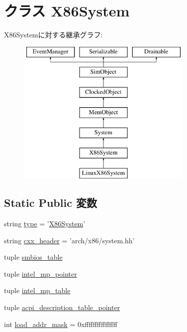 \hypertarget{classX86System_1_1X86System}{
\section{クラス X86System}
\label{classX86System_1_1X86System}
}
X86Systemに対する継承グラフ:\begin{figure}[H]
\begin{center}
\leavevmode
\includegraphics[height=7cm]{classX86System_1_1X86System}
\end{center}
\end{figure}
\subsection*{Static Public 変数}
\begin{DoxyCompactItemize}
\item 
string \hyperlink{classX86System_1_1X86System_acce15679d830831b0bbe8ebc2a60b2ca}{type} = '\hyperlink{classX86System_1_1X86System}{X86System}'
\item 
string \hyperlink{classX86System_1_1X86System_a17da7064bc5c518791f0c891eff05fda}{cxx\_\-header} = 'arch/x86/system.hh'
\item 
tuple \hyperlink{classX86System_1_1X86System_a9950505e3ac5f05cda0d31b9ba7b0dbd}{smbios\_\-table}
\item 
tuple \hyperlink{classX86System_1_1X86System_a11f2b7ef9e8e393db69cb20d02507b5f}{intel\_\-mp\_\-pointer}
\item 
tuple \hyperlink{classX86System_1_1X86System_a0e6ba9bdc7c99683f154358704494613}{intel\_\-mp\_\-table}
\item 
tuple \hyperlink{classX86System_1_1X86System_a890999088f0769472687e9e4b30bc682}{acpi\_\-description\_\-table\_\-pointer}
\item 
int \hyperlink{classX86System_1_1X86System_abd9c5cc6b7da624a69344d571bab1038}{load\_\-addr\_\-mask} = 0xffffffffffffffff
\end{DoxyCompactItemize}


